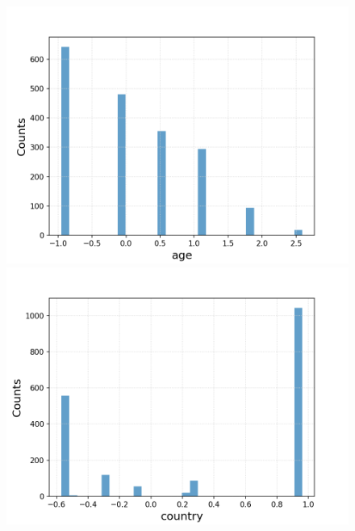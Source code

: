 \documentclass{article}
\begin{document}
\begin{figure}[h!]
	\centering
	\begin{minipage}[b]{0.32\textwidth}
		\includegraphics[width=\textwidth]{plots/drugsPlots/age.png}
		
	\end{minipage}
	\begin{minipage}[b]{0.32\textwidth}
		\includegraphics[width=\textwidth]{plots/drugsPlots/country.png}
		

\end{minipage}
\end{figure}
\end{document}
